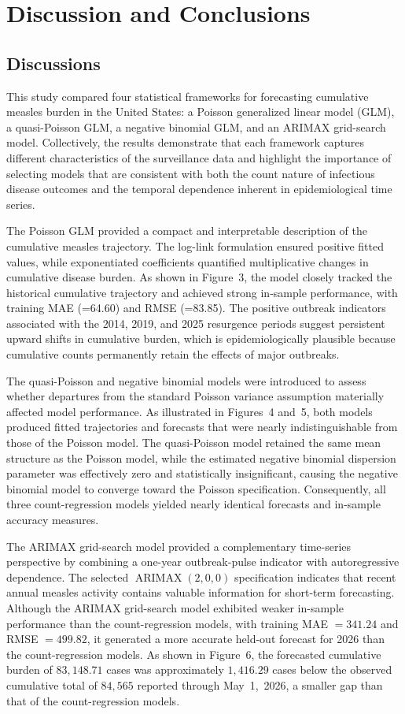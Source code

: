 \documentclass[utf8]{FrontiersinHarvard} %
\begin{document}
\section{Discussion and Conclusions}\label{Discusion}
\subsection{Discussions}
This study compared four statistical frameworks for forecasting cumulative measles burden in the United States: a Poisson generalized linear model (GLM), a quasi-Poisson GLM, a negative binomial GLM, and an ARIMAX grid-search model. Collectively, the results demonstrate that each framework captures different characteristics of the surveillance data and highlight the importance of selecting models that are consistent with both the count nature of infectious disease outcomes and the temporal dependence inherent in epidemiological time series.

The Poisson GLM provided a compact and interpretable description of the cumulative measles trajectory. The log-link formulation ensured positive fitted values, while exponentiated coefficients quantified multiplicative changes in cumulative disease burden. As shown in Figure~3, the model closely tracked the historical cumulative trajectory and achieved strong in-sample performance, with training MAE (=64.60) and RMSE (=83.85). The positive outbreak indicators associated with the 2014, 2019, and 2025 resurgence periods suggest persistent upward shifts in cumulative burden, which is epidemiologically plausible because cumulative counts permanently retain the effects of major outbreaks.

The quasi-Poisson and negative binomial models were introduced to assess whether departures from the standard Poisson variance assumption materially affected model performance. As illustrated in Figures~4 and~5, both models produced fitted trajectories and forecasts that were nearly indistinguishable from those of the Poisson model. The quasi-Poisson model retained the same mean structure as the Poisson model, while the estimated negative binomial dispersion parameter was effectively zero and statistically insignificant, causing the negative binomial model to converge toward the Poisson specification. Consequently, all three count-regression models yielded nearly identical forecasts and in-sample accuracy measures.

The ARIMAX grid-search model provided a complementary time-series perspective by combining a one-year outbreak-pulse indicator with autoregressive dependence. The selected \(\operatorname{ARIMAX}(2,0,0)\) specification indicates that recent annual measles activity contains valuable information for short-term forecasting. Although the ARIMAX grid-search model exhibited weaker in-sample performance than the count-regression models, with training MAE \(=341.24\) and RMSE \(=499.82\), it generated a more accurate held-out forecast for 2026 than the count-regression models. As shown in Figure~6, the forecasted cumulative burden of \(83,148.71\) cases was approximately \(1,416.29\) cases below the observed cumulative total of \(84,565\) reported through May~1,~2026, a smaller gap than that of the count-regression models.
\end{document}
